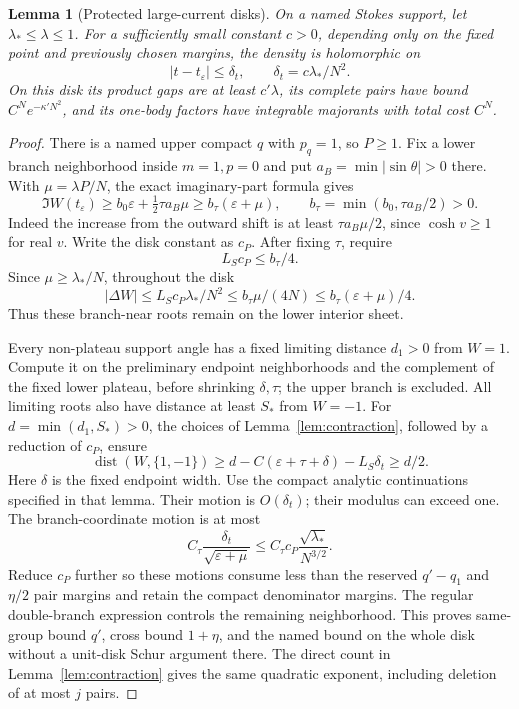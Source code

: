 \documentclass[11pt]{article}
\numberwithin{equation}{section}
\newtheorem{lemma}[theorem]{Lemma}
\theoremstyle{definition}
\newcommand{\eps}{\varepsilon}
\begin{document}
\begin{lemma}[Protected large-current disks]\label{lem:protected}
On a named Stokes support, let \(\lambda_*\le\lambda\le1\).
For a sufficiently small constant \(c>0\), depending only on
the fixed point and previously chosen margins, the density is
holomorphic on
\[
 |t-t_\eps|\le\delta_t,\qquad \delta_t=c\lambda_*/N^2 .
\]
On this disk its product gaps are at least \(c'\lambda\),
its complete pairs have bound \(C^Ne^{-\kappa' N^2}\), and its
one-body factors have integrable majorants with total cost \(C^N\).
\end{lemma}
\begin{proof}
There is a named upper compact \(q\) with \(p_q=1\), so
\(P\ge1\). Fix a lower branch neighborhood inside \(m=1,p=0\)
and put \(a_B=\min|\sin\theta|>0\) there. With
\(\mu=\lambda P/N\), the exact imaginary-part formula gives
\[
 \Im W(t_\eps)\ge b_0\eps+\tfrac12\tau a_B\mu
 \ge b_\tau(\eps+\mu),\qquad
 b_\tau=\min(b_0,\tau a_B/2)>0.
\]
Indeed the increase from the outward shift is at least
\(\tau a_B\mu/2\), since \(\cosh v\ge1\) for real \(v\).
Write the disk constant as \(c_P\). After fixing \(\tau\), require
\[
 L_Sc_P\le b_\tau/4.
\]
Since \(\mu\ge\lambda_*/N\), throughout the disk
\[
 |\Delta W|\le L_Sc_P\lambda_*/N^2
 \le b_\tau \mu/(4N)\le b_\tau(\eps+\mu)/4.
\]
Thus these branch-near roots remain on the lower interior sheet.

Every non-plateau support angle has a fixed limiting distance
\(d_1>0\) from \(W=1\). Compute it on the preliminary endpoint
neighborhoods and the complement of the fixed lower plateau,
before shrinking \(\delta,\tau\); the upper branch is excluded.
All limiting
roots also have distance at least \(S_*\) from \(W=-1\).
For \(d=\min(d_1,S_*)>0\), the choices of
Lemma~\ref{lem:contraction}, followed by a reduction of \(c_P\),
ensure
\[
 \operatorname{dist}(W,\{1,-1\})
 \ge d-C(\eps+\tau+\delta)-L_S\delta_t\ge d/2.
\]
Here \(\delta\) is the fixed endpoint width.
Use the compact analytic continuations specified in that lemma.
Their motion is \(O(\delta_t)\); their modulus can exceed one.
The branch-coordinate motion is at most
\[
 C_\tau\frac{\delta_t}{\sqrt{\eps+\mu}}
 \le C_\tau c_P\frac{\sqrt{\lambda_*}}{N^{3/2}}.
\]
Reduce \(c_P\) further so these motions consume less than
the reserved \(q'-q_1\) and \(\eta/2\) pair margins and retain
the compact denominator margins. The regular double-branch
expression controls the remaining neighborhood. This proves
same-group bound \(q'\), cross bound \(1+\eta\), and the named
bound on the whole disk without a unit-disk Schur argument there.
The direct count in Lemma~\ref{lem:contraction} gives the same
quadratic exponent, including deletion of at most \(j\) pairs.


\end{proof}
\end{document}
